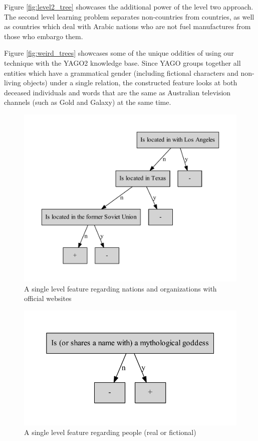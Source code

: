 \documentclass{article}
\theoremstyle{definition}
\begin{document}
Figure \ref{fig:level2_tree} showcases the additional power of the level two approach. The second level learning problem separates non-countries from countries, as well as countries which deal with Arabic nations who are not fuel manufactures from those who embargo them.

Figure \ref{fig:weird_trees} showcases some of the unique oddities of using our technique with the YAGO2 knowledge base. Since YAGO groups together all entities which have a grammatical gender (including fictional characters and non-living objects) under a single relation, the constructed feature looks at both deceased individuals and words that are the same as Australian television channels (such as Gold and Galaxy) at the same time. 

\begin{figure}[H]
	\centering
	\includegraphics[width=\linewidth]{level1_good.pdf}
	\caption{A single level feature regarding nations and organizations with official websites}
	\label{fig:level1_good}
\end{figure}

\begin{figure}[H]
	\centering
	\includegraphics[width=\linewidth]{level1_simple.pdf}
	\caption{A single level feature regarding people (real or fictional)}
	\label{fig:level1_simple}
\end{figure}
\end{document}
